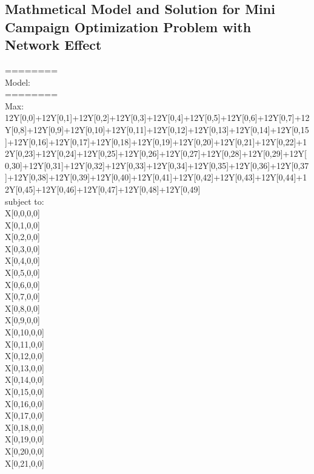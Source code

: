 \documentclass[11pt]{article}
\begin{document}
\subsection{Mathmetical Model and Solution for Mini Campaign Optimization Problem with Network Effect}\label{s:apendix-mini-net-cplex-sol}
========\\
Model:\\
========\\
Max:\\
        12Y[0,0]+12Y[0,1]+12Y[0,2]+12Y[0,3]+12Y[0,4]+12Y[0,5]+12Y[0,6]+12Y[0,7]+12Y[0,8]+12Y[0,9]+12Y[0,10]+12Y[0,11]+12Y[0,12]+12Y[0,13]+12Y[0,14]+12Y[0,15]+12Y[0,16]+12Y[0,17]+12Y[0,18]+12Y[0,19]+12Y[0,20]+12Y[0,21]+12Y[0,22]+12Y[0,23]+12Y[0,24]+12Y[0,25]+12Y[0,26]+12Y[0,27]+12Y[0,28]+12Y[0,29]+12Y[0,30]+12Y[0,31]+12Y[0,32]+12Y[0,33]+12Y[0,34]+12Y[0,35]+12Y[0,36]+12Y[0,37]+12Y[0,38]+12Y[0,39]+12Y[0,40]+12Y[0,41]+12Y[0,42]+12Y[0,43]+12Y[0,44]+12Y[0,45]+12Y[0,46]+12Y[0,47]+12Y[0,48]+12Y[0,49]\\
subject to:\\
        X[0,0,0,0] \\
        X[0,1,0,0] \\
        X[0,2,0,0] \\
        X[0,3,0,0] \\
        X[0,4,0,0] \\
        X[0,5,0,0] \\
        X[0,6,0,0] \\
        X[0,7,0,0] \\
        X[0,8,0,0] \\
        X[0,9,0,0] \\
        X[0,10,0,0] \\
        X[0,11,0,0] \\
        X[0,12,0,0] \\
        X[0,13,0,0] \\
        X[0,14,0,0] \\
        X[0,15,0,0] \\
        X[0,16,0,0] \\
        X[0,17,0,0] \\
        X[0,18,0,0] \\
        X[0,19,0,0] \\
        X[0,20,0,0] \\
        X[0,21,0,0] \\
\end{document}
